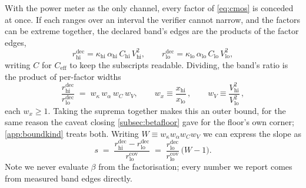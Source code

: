 \documentclass{article}
\theoremstyle{plain}
\theoremstyle{definition}
\theoremstyle{remark}
\begin{document}
With the power meter as the only channel, every factor of \cref{eq:cmos} is
conceded at once. If each ranges over an interval the verifier cannot narrow,
and the factors can be extreme together, the declared band's edges are the
products of the factor edges,
\begin{equation}
	r_{\mathrm{hi}}^{\mathrm{dec}} =
	\kappa_{\mathrm{hi}}\,\alpha_{\mathrm{hi}}\,C_{\mathrm{hi}}\,V_{\mathrm{hi}}^2,
	\qquad
	r_{\mathrm{lo}}^{\mathrm{dec}} =
	\kappa_{\mathrm{lo}}\,\alpha_{\mathrm{lo}}\,C_{\mathrm{lo}}\,V_{\mathrm{lo}}^2,
	\label{eq:edgefactor}
\end{equation}
writing $C$ for $C_{\mathrm{eff}}$ to keep the subscripts readable. Dividing,
the band's ratio is the product of per-factor widths
\begin{equation}
	\frac{r_{\mathrm{hi}}^{\mathrm{dec}}}{r_{\mathrm{lo}}^{\mathrm{dec}}}
	\;=\; w_\kappa\,w_\alpha\,w_C\,w_V,
	\qquad w_x \equiv \frac{x_{\mathrm{hi}}}{x_{\mathrm{lo}}}\,,
	\qquad w_V \equiv \frac{V_{\mathrm{hi}}^2}{V_{\mathrm{lo}}^2}\,,
	\label{eq:widthfactor}
\end{equation}
each $w_x \ge 1$. Taking the suprema together makes this an outer bound, for the
same reason the caveat closing \cref{subsec:betafloor} gave for the floor's own
corner; \cref{app:boundkind} treats both. Writing
$W \equiv w_\kappa w_\alpha w_C w_V$ we can express the slope as 
\begin{equation}
	s \;=\;
	\frac{r_{\mathrm{hi}}^{\mathrm{dec}} - r_{\mathrm{lo}}^{\mathrm{dec}}}
	     {r_{\mathrm{lo}}^{\mathrm{cov}}}
	\;=\; \frac{r_{\mathrm{lo}}^{\mathrm{dec}}}{r_{\mathrm{lo}}^{\mathrm{cov}}}
	      \,\bigl(W - 1\bigr).
	\label{eq:slopebridge}
\end{equation}
Note  we never evaluate $\beta$ from the factorisation; every number we report comes
from measured band edges directly.
\end{document}
